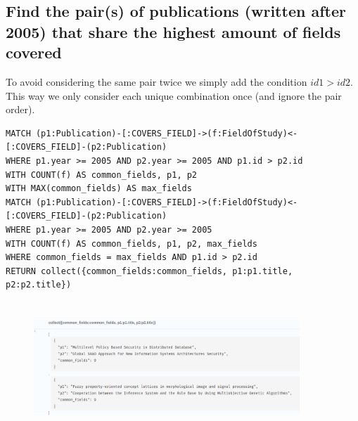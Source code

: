 \documentclass{Configuration_Files/PoliMi3i_thesis}
\begin{document}
\subsection{Find the pair(s) of publications (written after 2005) that share the highest amount of fields covered}
To avoid considering the same pair twice we simply add the condition $id1 > id2$. This way we only consider each unique combination once (and ignore the pair order).\\
\begin{lstlisting}[language=cypher, label=lst:cypher-example]
MATCH (p1:Publication)-[:COVERS_FIELD]->(f:FieldOfStudy)<-[:COVERS_FIELD]-(p2:Publication)
WHERE p1.year >= 2005 AND p2.year >= 2005 AND p1.id > p2.id
WITH COUNT(f) AS common_fields, p1, p2
WITH MAX(common_fields) AS max_fields
MATCH (p1:Publication)-[:COVERS_FIELD]->(f:FieldOfStudy)<-[:COVERS_FIELD]-(p2:Publication)
WHERE p1.year >= 2005 AND p2.year >= 2005
WITH COUNT(f) AS common_fields, p1, p2, max_fields
WHERE common_fields = max_fields AND p1.id > p2.id
RETURN collect({common_fields:common_fields, p1:p1.title, p2:p2.title})
\end{lstlisting}
\begin{figure}[H]
    \centering
    \includegraphics[width=100mm, height=50mm]{Images/query_7.png}
        \caption{}
    \label{fig:quadtree}
\end{figure}
\end{document}
